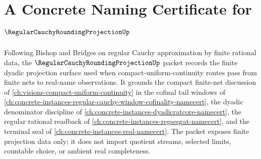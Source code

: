 \chapter{A Concrete Naming Certificate for $\RegularCauchyRoundingProjectionUp$}
\label{ch:concrete-instances-regular-cauchy-rounding-projection-namecert}

Following Bishop and Bridges on regular Cauchy approximation by finite rational data, the $\RegularCauchyRoundingProjectionUp$ packet records the finite dyadic projection surface used when compact-uniform-continuity routes pass from finite nets to real-name observations. It grounds the compact finite-net discussion of \autoref{ch:visions-compact-uniform-continuity} in the cofinal tail windows of \autoref{ch:concrete-instances-regular-cauchy-window-cofinality-namecert}, the dyadic denominator discipline of \autoref{ch:concrete-instances-dyadicratcore-namecert}, the regular rational readback of \autoref{ch:concrete-instances-regseqrat-namecert}, and the terminal seal of \autoref{ch:concrete-instances-real-namecert}. The packet exposes finite projection data only; it does not import quotient streams, selected limits, countable choice, or ambient real completeness.

